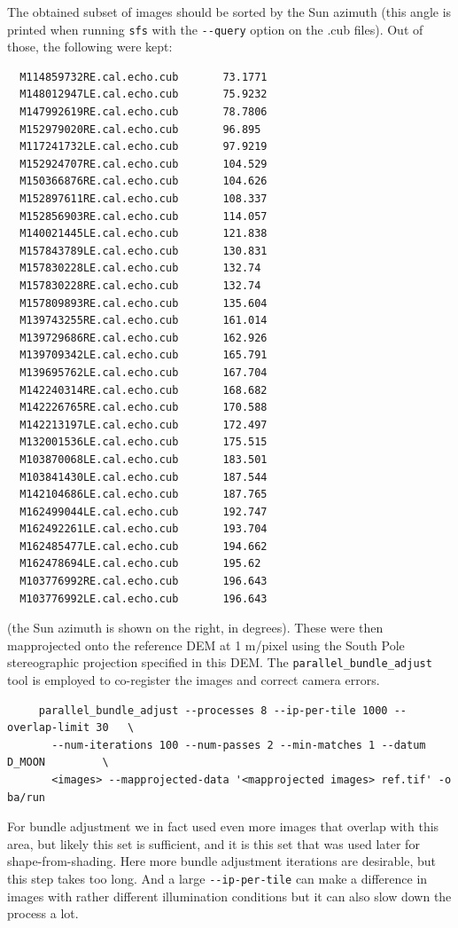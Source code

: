 The obtained subset of images should be sorted by the Sun azimuth (this
angle is printed when running \texttt{sfs} with the \texttt{-\/-query}
option on the .cub files). Out of those, the following were kept:

\begin{verbatim}
  M114859732RE.cal.echo.cub       73.1771
  M148012947LE.cal.echo.cub       75.9232
  M147992619RE.cal.echo.cub       78.7806
  M152979020RE.cal.echo.cub       96.895
  M117241732LE.cal.echo.cub       97.9219
  M152924707RE.cal.echo.cub       104.529
  M150366876RE.cal.echo.cub       104.626
  M152897611RE.cal.echo.cub       108.337
  M152856903RE.cal.echo.cub       114.057
  M140021445LE.cal.echo.cub       121.838
  M157843789LE.cal.echo.cub       130.831
  M157830228LE.cal.echo.cub       132.74
  M157830228RE.cal.echo.cub       132.74
  M157809893RE.cal.echo.cub       135.604
  M139743255RE.cal.echo.cub       161.014
  M139729686RE.cal.echo.cub       162.926
  M139709342LE.cal.echo.cub       165.791
  M139695762LE.cal.echo.cub       167.704
  M142240314RE.cal.echo.cub       168.682
  M142226765RE.cal.echo.cub       170.588
  M142213197LE.cal.echo.cub       172.497
  M132001536LE.cal.echo.cub       175.515
  M103870068LE.cal.echo.cub       183.501
  M103841430LE.cal.echo.cub       187.544
  M142104686LE.cal.echo.cub       187.765
  M162499044LE.cal.echo.cub       192.747
  M162492261LE.cal.echo.cub       193.704
  M162485477LE.cal.echo.cub       194.662
  M162478694LE.cal.echo.cub       195.62
  M103776992RE.cal.echo.cub       196.643
  M103776992LE.cal.echo.cub       196.643
\end{verbatim}

(the Sun azimuth is shown on the right, in degrees). These were then mapprojected
onto the reference DEM at 1 m/pixel using the South Pole stereographic
projection specified in this DEM. The \texttt{parallel\_bundle\_adjust}
tool is employed to co-register the images and correct camera errors. 

\begin{verbatim}
     parallel_bundle_adjust --processes 8 --ip-per-tile 1000 --overlap-limit 30   \
       --num-iterations 100 --num-passes 2 --min-matches 1 --datum D_MOON         \
       <images> --mapprojected-data '<mapprojected images> ref.tif' -o ba/run
\end{verbatim}

For bundle adjustment we in fact used even more images that overlap with
this area, but likely this set is sufficient, and it is this set that
was used later for shape-from-shading. Here more bundle adjustment
iterations are desirable, but this step takes too long. And a large
\texttt{-\/-ip-per-tile} can make a difference in images with rather
different illumination conditions but it can also slow down the process
a lot.

